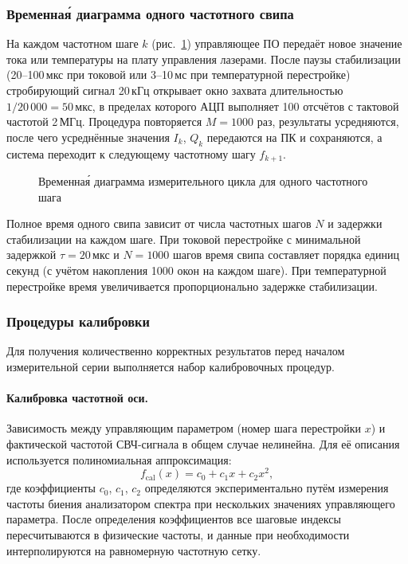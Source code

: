 \subsubsection{Временна\'{я} диаграмма одного частотного свипа}

На каждом частотном шаге $k$ (рис.~\ref{fig:timing-diagram}) управляющее ПО
передаёт новое значение тока или температуры на плату управления лазерами.
После паузы стабилизации (20--100\,мкс при токовой или 3--10\,мс при
температурной перестройке) стробирующий сигнал 20\,кГц открывает окно захвата
длительностью $1/20\,000 = 50$\,мкс, в пределах которого АЦП выполняет
100 отсчётов с тактовой частотой 2\,МГц. Процедура повторяется $M = 1000$ раз,
результаты усредняются, после чего усреднённые значения $I_k$, $Q_k$
передаются на ПК и сохраняются, а система переходит к следующему частотному
шагу $f_{k+1}$.

\begin{figure}[H]
    \centering
    \caption{Временна\'{я} диаграмма измерительного цикла для одного
    частотного шага}
    \label{fig:timing-diagram}
\end{figure}

Полное время одного свипа зависит от числа частотных шагов $N$ и задержки
стабилизации на каждом шаге. При токовой перестройке с минимальной задержкой
$\tau = 20$\,мкс и $N = 1000$ шагов время свипа составляет порядка единиц
секунд (с учётом накопления 1000 окон на каждом шаге). При температурной
перестройке время увеличивается пропорционально задержке стабилизации.

\subsubsection{Процедуры калибровки}

Для получения количественно корректных результатов перед началом
измерительной серии выполняется набор калибровочных процедур.

\paragraph{Калибровка частотной оси.}
Зависимость между управляющим параметром (номер шага перестройки $x$) и
фактической частотой СВЧ-сигнала в общем случае нелинейна. Для её описания
используется полиномиальная аппроксимация:
\begin{equation}
    f_{\mathrm{cal}}(x) = c_0 + c_1 x + c_2 x^2,
    \label{eq:freq-cal}
\end{equation}
где коэффициенты $c_0$, $c_1$, $c_2$ определяются экспериментально путём
измерения частоты биения анализатором спектра при нескольких значениях
управляющего параметра. После определения коэффициентов все шаговые индексы
пересчитываются в физические частоты, и данные при необходимости
интерполируются на равномерную частотную сетку.

